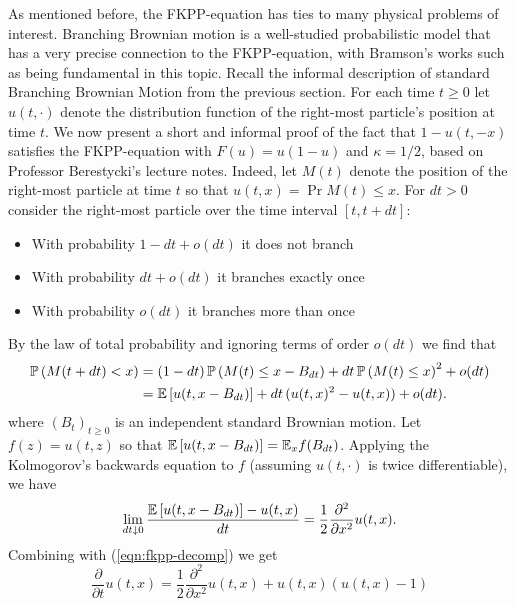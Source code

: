 As mentioned before, the FKPP-equation has ties to many physical problems of interest. Branching Brownian motion is a well-studied probabilistic model that has a very precise connection to the FKPP-equation, with Bramson's works such as \cite{bramson1983convergence,bramson1978maximal} being fundamental in this topic. Recall the informal description of standard Branching Brownian Motion from the previous section. For each time $t \geq 0$ let $u(t, \cdot)$ denote the distribution function of the right-most particle's position at time $t$. We now present a short and informal proof of the fact that $1 - u(t, - x)$ satisfies the FKPP-equation with $F(u) = u(1 - u)$ and $\kappa = 1/2$, based on Professor Berestycki's lecture notes. Indeed, let $M(t)$ denote the position of the right-most particle at time $t$ so that $u(t, x) = \Pr{M(t) \leq x}$. For $dt > 0$ consider the right-most particle over the time interval $[t, t+dt]$:
\begin{itemize}
\item \vspace{-2mm}With probability $1 - dt + o(dt)$ it does not branch
\item \vspace{-2mm}With probability $dt + o(dt)$ it branches exactly once
\item \vspace{-2mm}With probability $o(dt)$ it branches more than once
\end{itemize}	
By the law of total probability and ignoring terms of order $o(dt)$ we find that 
\begin{align}
\mathbb{P} \left( M(t + dt) < x \right) &= (1 - dt)\, \mathbb{P} \left( M(t) \leq x - B_{dt} \right) + dt\, \mathbb{P} \left( M(t) \leq x \right)^2 + o(dt)\nonumber \\
				   &= \mathbb{E}\left[ u(t, x - B_{dt}) \right] + dt\, (u(t,x)^2 - u(t,x)) + o(dt). \label{eqn:fkpp-decomp} 
\end{align}
where $(B_t)_{t \geq 0}$ is an independent standard Brownian motion. Let $f(z) = u(t, z)$ so that $\mathbb{E}\left[ u(t, x - B_{dt}) \right] = \mathbb{E}_x f(B_{dt})$. Applying the Kolmogorov's backwards equation to $f$ (assuming $u(t, \cdot)$ is twice differentiable), we have 
\begin{equation}\nonumber
\lim\limits_{dt \downarrow 0} \frac{\mathbb{E}\left[ u(t, x - B_{dt}) \right] - u(t, x)}{dt} = \frac{1}{2} \frac{\partial^2}{\partial x^2} u(t, x). 
\end{equation}
Combining with (\ref{eqn:fkpp-decomp}) we get 
\begin{equation}\label{eqn:shitty_FKPP}
\frac{\partial}{\partial t} u(t, x) = \frac{1}{2} \frac{\partial^2}{\partial x^2} u(t, x) + u(t, x)(u(t, x) - 1)
\end{equation}
